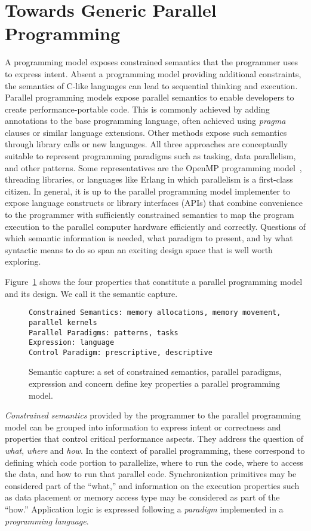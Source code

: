\section{Towards Generic Parallel Programming}\label{chap:background}

A programming model exposes constrained semantics that the programmer uses to express intent. Absent a programming model providing additional constraints, the semantics of C-like languages can lead to sequential thinking and execution. Parallel programming models expose parallel semantics to enable developers to create performance-portable code. This is commonly achieved by adding annotations to the base programming language, often achieved using \emph{pragma} clauses or similar language extensions. Other methods expose such semantics through library calls or new languages. All three approaches are conceptually suitable to represent programming paradigms such as tasking, data parallelism, and other patterns. Some representatives are the OpenMP programming model~\cite{CITEOPENMP}, threading libraries, or languages like Erlang in which parallelism is a first-class citizen. In general, it is up to the parallel programming model implementer to expose language constructs or library interfaces (APIs) that combine convenience to the programmer with sufficiently constrained semantics to map the program execution to the parallel computer hardware efficiently and correctly. Questions of which semantic information is needed, what paradigm to present, and by what syntactic means to do so span an exciting design space that is well worth exploring.

 Figure~\ref{figSemCapture} shows the four properties that constitute a parallel programming model and its design. We call it the semantic capture.

\begin{figure}[h]
\begin{Verbatim}[frame=leftline]
Constrained Semantics: memory allocations, memory movement, parallel kernels
Parallel Paradigms: patterns, tasks
Expression: language 
Control Paradigm: prescriptive, descriptive
\end{Verbatim}
\caption{Semantic capture: a set of constrained semantics, parallel paradigms, expression and concern define key properties a parallel programming model.}
\label{figSemCapture}
\end{figure}

\emph{Constrained semantics} provided by the programmer to the parallel programming model can be grouped into information to express intent or correctness and properties that control critical performance aspects. They address the question of \emph{what}, \emph{where} and \emph{how}. In the context of parallel programming, these correspond to defining which code portion to parallelize, where to run the code, where to access the data, and how to run that parallel code. Synchronization primitives may be considered part of the ``what,'' and information on the execution properties such as data placement or memory access type may be considered as part of the ``how.'' Application logic is expressed following a \emph{paradigm} implemented in a \emph{programming language}.

